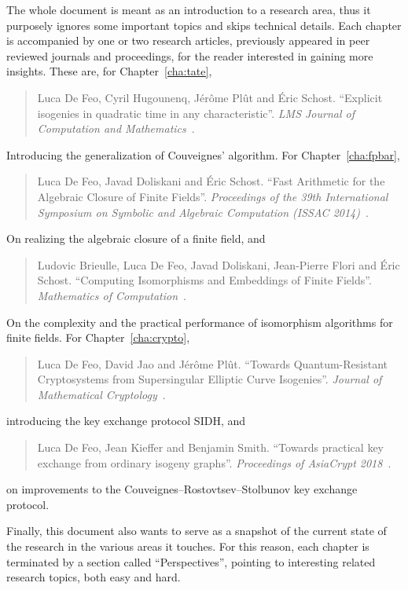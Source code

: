 \documentclass[b5layout]{hdr}
\begin{document}
The whole document is meant as an introduction to a research area,
thus it purposely ignores some important topics and skips technical
details. %
Each chapter is accompanied by one or two research articles,
previously appeared in peer reviewed journals and proceedings, for the
reader interested in gaining more insights. %
These are, for Chapter~\ref{cha:tate},
\begin{quote}
  Luca De Feo, Cyril Hugounenq, Jérôme Plût and Éric Schost. %
  ``Explicit isogenies in quadratic time in any characteristic''. %
  \emph{LMS Journal of Computation and
    Mathematics}~\cite{defeo2016explicit}.
\end{quote}
Introducing the generalization of Couveignes' algorithm. %
For Chapter~\ref{cha:fpbar},
\begin{quote}
  Luca De Feo, Javad Doliskani and Éric Schost. %
  ``Fast Arithmetic for the Algebraic Closure of Finite Fields''. %
  \emph{Proceedings of the 39th International Symposium on Symbolic
    and Algebraic Computation (ISSAC 2014)}~\cite{DeDoSc2014}.
\end{quote}
On realizing the algebraic closure of a finite field, and
\begin{quote}
  Ludovic Brieulle, Luca De Feo, Javad Doliskani, Jean-Pierre Flori
  and Éric Schost. %
  ``Computing Isomorphisms and Embeddings of Finite Fields''. %
  \emph{Mathematics of Computation}~\cite{brieulle2018computing}.
\end{quote}
On the complexity and the practical performance of isomorphism
algorithms for finite fields. %
For Chapter~\ref{cha:crypto},
\begin{quote}
  Luca De Feo, David Jao and Jérôme Plût. %
  ``Towards Quantum-Resistant Cryptosystems from Supersingular
  Elliptic Curve Isogenies''. %
  \emph{Journal of Mathematical Cryptology}~\cite{defeo+jao+plut12}.
\end{quote}
introducing the key exchange protocol SIDH, and
\begin{quote}
  Luca De Feo, Jean Kieffer and Benjamin Smith. %
  ``Towards practical key exchange from ordinary isogeny graphs''. %
  \emph{Proceedings of AsiaCrypt 2018}~\cite{10.1007/978-3-030-03332-3_14}.
\end{quote}
on improvements to the Couveignes--Rostovtsev--Stolbunov key exchange
protocol. %

Finally, this document also wants to serve as a snapshot of the
current state of the research in the various areas it touches. %
For this reason, each chapter is terminated by a section called
``Perspectives'', pointing to interesting related research topics,
both easy and hard.
\end{document}
